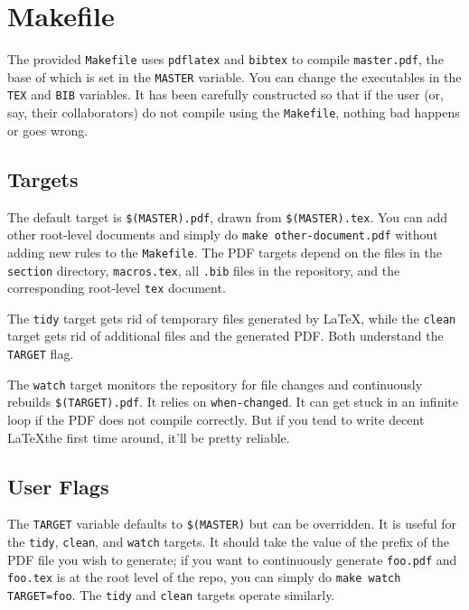 \section{Makefile}\label{sec:make}

The provided \texttt{Makefile} uses \texttt{pdflatex} and \texttt{bibtex} to compile \texttt{master.pdf}, the base of which is set in the \texttt{MASTER} variable.
You can change the executables in the \texttt{TEX} and \texttt{BIB} variables.  It has been carefully constructed so that if the user (or, say, their collaborators) do not compile using the \texttt{Makefile}, nothing bad happens or goes wrong.

\subsection{Targets}

The default target is \texttt{\$(MASTER).pdf}, drawn from \texttt{\$(MASTER).tex}.
You can add other root-level documents and simply do \texttt{make other-document.pdf} without adding new rules to the \texttt{Makefile}.
The PDF targets depend on the files in the \texttt{section} directory, \texttt{macros.tex}, all \texttt{.bib} files in the repository, and the corresponding root-level \texttt{tex} document.

The \texttt{tidy} target gets rid of temporary files generated by \LaTeX, while the \texttt{clean} target gets rid of additional files and the generated PDF.  Both understand the \texttt{TARGET} flag.

The \texttt{watch} target monitors the repository for file changes and continuously rebuilds \texttt{\$(TARGET).pdf}.  It relies on \texttt{when-changed}\cite{when-changed}.
It can get stuck in an infinite loop if the PDF does not compile correctly.
But if you tend to write decent \LaTeX the first time around, it'll be pretty reliable.


\subsection{User Flags}

The \texttt{TARGET} variable defaults to \texttt{\$(MASTER)} but can be overridden.  It is useful for the \texttt{tidy}, \texttt{clean}, and \texttt{watch} targets.
It should take the value of the prefix of the PDF file you wish to generate; if you want to continuously generate \texttt{foo.pdf} and \texttt{foo.tex} is at the root level of the repo, you can simply do \texttt{make watch TARGET=foo}.
The \texttt{tidy} and \texttt{clean} targets operate similarly.


